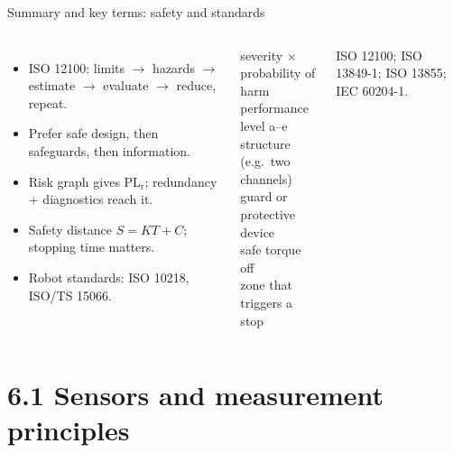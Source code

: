 \documentclass[aspectratio=169,10pt]{beamer}
\begin{document}
\begin{frame}{Summary and key terms: safety and standards}
\begin{columns}[T]
\begin{itemize}\small
\item ISO 12100: limits $\rightarrow$ hazards $\rightarrow$ estimate $\rightarrow$ evaluate $\rightarrow$ reduce, repeat.
\item Prefer safe design, then safeguards, then information.
\item Risk graph gives PL$_\text{r}$; redundancy + diagnostics reach it.
\item Safety distance $S=KT+C$; stopping time matters.
\item Robot standards: ISO 10218, ISO/TS 15066.
\end{itemize}
\begin{defbox}
\small
{} severity $\times$ probability of harm\\
 performance level a--e\\
 structure (e.g.\ two channels)\\
 guard or protective device\\
 safe torque off\\
 zone that triggers a stop
\end{defbox}
{\scriptsize\color{mkGray} ISO 12100; ISO 13849-1; ISO 13855; IEC 60204-1.}
\end{columns}
\end{frame}

\section{6.1 Sensors and measurement principles}
\end{document}
